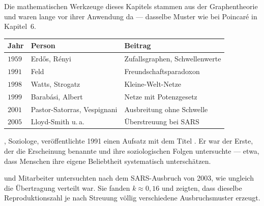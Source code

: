 \begin{geschichte}
Die mathematischen Werkzeuge dieses Kapitels stammen aus der Graphentheorie und waren lange vor ihrer Anwendung da --- dasselbe Muster wie bei Poincaré in Kapitel~6.

\begin{center}
{\small
\renewcommand{\arraystretch}{1.45}
\begin{tabular}{@{}P{1.4cm}P{2.6cm}P{3.8cm}@{}}
\toprule
\textbf{Jahr} & \textbf{Person} & \textbf{Beitrag}\\
\midrule
$1959$ & Erdős, Rényi & Zufallsgraphen, Schwellenwerte\\
$1991$ & Feld & Freundschafts\-paradoxon\\
$1998$ & Watts, Strogatz & Kleine-Welt-Netze\\
$1999$ & Barabási, Albert & Netze mit Potenzgesetz\\
$2001$ & Pastor-Satorras, Vespignani & Ausbreitung ohne Schwelle\\
$2005$ & Lloyd-Smith u.\,a. & Überstreuung bei SARS\\
\bottomrule
\end{tabular}}
\end{center}

, Soziologe, veröffentlichte 1991 einen Aufsatz mit dem Titel . Er war der Erste, der die Erscheinung benannte und ihre soziologischen Folgen untersuchte --- etwa, dass Menschen ihre eigene Beliebtheit systematisch unterschätzen.

\begin{center}
\begin{minipage}{0.9\textwidth}
\end{minipage}
\end{center}

 und Mitarbeiter untersuchten nach dem SARS-Ausbruch von 2003, wie ungleich die Übertragung verteilt war. Sie fanden $k \approx 0{,}16$ und zeigten, dass dieselbe Reproduktionszahl je nach Streuung völlig verschiedene Ausbruchsmuster erzeugt.

\begin{center}
\begin{minipage}{0.9\textwidth}
\end{minipage}
\end{center}
\end{geschichte}

